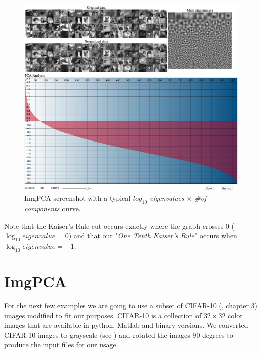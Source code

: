 \documentclass{article} %
\begin{document}

\begin{figure}[h]
\begin{center}
\includegraphics[width=\textwidth]{imgPca.png}
\end{center}
\caption{ImgPCA screenshot with a typical \emph{$log_{10}$ eigenvalues $\times$ \#of components} curve.}
\end{figure}
Note that the Kaiser's Rule cut occurs exactly where the graph crosses $0$ ($\log_{10} eigenvalue = 0$) and that our "\emph{One Tenth Kaiser's Rule}" occurs when $\log_{10} eigenvalue = -1$.
\section{ImgPCA}

For the next few examples we are going to use a subset of CIFAR-10 (\citet{krizhevsky2009learning}, chapter 3) images modified to fit our purposes. CIFAR-10 is a collection of $32\times 32$ color images that are available in python, Matlab and binary versions. We converted CIFAR-10 images to grayscale (see ) and rotated the images $90$ degrees to produce the input files for our usage.\par
\end{document}
